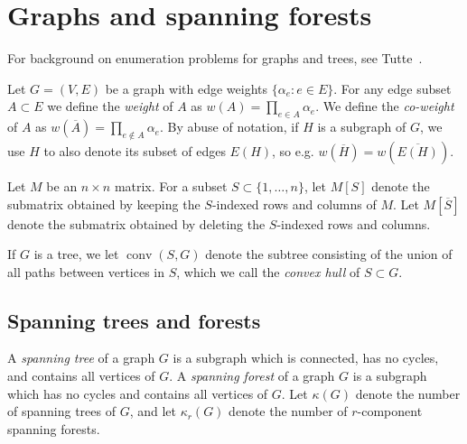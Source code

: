 \documentclass{amsart}
\theoremstyle{definition}
\DeclareMathOperator{\conv}{conv}
\newcommand{\trees}{\mathcal{F}_1}
\newcommand{\forests}{\mathcal{F}}
\newcommand{\coweight}[1]{w(\overline{#1})}
\newcommand{\note}[1]{{\color{red} \sf $\diamondsuit$  {#1} $\diamondsuit$ }}
\begin{document}

%
%
%
%
%
%
%


\section{Graphs and spanning forests}
\label{sec:graphs-matrices}

For background on enumeration problems for graphs and trees, 
see 
Tutte~\cite[Chapter VI]{tutte}. 

Let $G = (V, E)$ be a graph with edge weights $\{ \alpha_e : e \in E\}$.
For any edge subset $A \subset E$ we define the {\em weight} of $A$ as
$\displaystyle
	w(A) = \prod_{e \in A} \alpha_e.
$
We define the {\em co-weight} of $A$ as
$\displaystyle
	w(\overline A) = \prod_{e \not\in A} \alpha_e.
$
By abuse of notation, if $H$ is a subgraph of $G$, we use $H$ to also denote its subset of edges $E(H)$, so e.g. $\coweight{H} = \coweight{E(H)}$.

Let $M$ be an $n \times n$ matrix.
For a subset $S \subset \{1, \ldots, n\}$, 
let $M[S]$ denote the submatrix obtained by keeping the $S$-indexed rows and columns of $M$.
Let $M[\overline{S}]$ denote the submatrix obtained by deleting the $S$-indexed rows and columns.

If $G$ is a tree, we let $\conv(S,G)$ denote the subtree consisting of the union of all paths between vertices in $S$,
which we call the {\em convex hull} of $S \subset G$.

\subsection{Spanning trees and forests}

A {\em spanning tree} of a graph $G$ is a subgraph which 
is connected, has no cycles,
and contains all vertices of $G$.
A {\em spanning forest} of a graph $G$ is a subgraph which 
has no cycles
and 
contains all vertices of $G$. 
Let $\kappa(G)$ denote the number of spanning trees of $G$, and let $\kappa_r(G)$ denote the number of $r$-component spanning forests.
\end{document}
